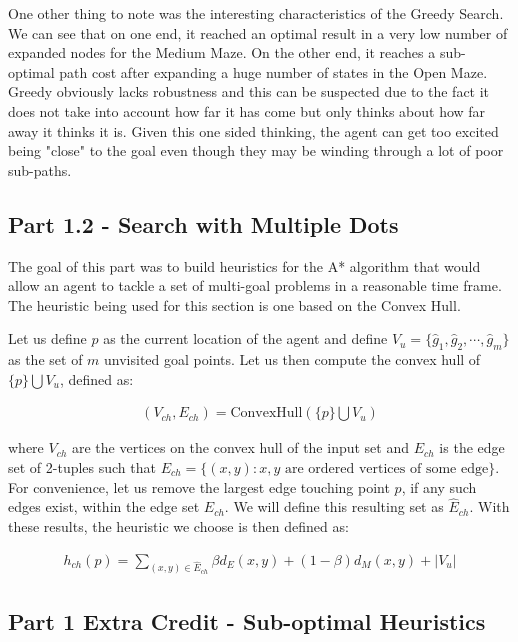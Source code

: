 \documentclass{article}[12pt]
\begin{document}
   One other thing to note was the interesting characteristics of the Greedy Search. We can see that on one end, it reached an optimal result in a very low number of expanded nodes for the Medium Maze. On the other end, it reaches a sub-optimal path cost after expanding a huge number of states in the Open Maze. Greedy obviously lacks robustness and this can be suspected due to the fact it does not take into account how far it has come but only thinks about how far away it thinks it is. Given this one sided thinking, the agent can get too excited being "close" to the goal even though they may be winding through a lot of poor sub-paths.
   
    
   
    \newpage
   \subsection{Part 1.2 - Search with Multiple Dots}
The goal of this part was to build heuristics for the A* algorithm that would allow an agent to tackle a set of multi-goal problems in a reasonable time frame. The heuristic being used for this section is one based on the Convex Hull. 

Let us define $p$ as the current location of the agent and define $V_u = \lbrace \hat{g}_1, \hat{g}_2, \cdots, \hat{g}_m \rbrace$ as the set of $m$ unvisited goal points. Let us then compute the convex hull of $\lbrace p \rbrace \bigcup V_u$, defined as:

\begin{align*}
\left(V_{ch}, E_{ch} \right) = \text{ConvexHull}\left(\lbrace p \rbrace \bigcup V_u \right)
\end{align*}

where $V_{ch}$ are the vertices on the convex hull of the input set and $E_{ch}$ is the edge set of 2-tuples such that $E_{ch} = \lbrace (x,y): x,y \text{ are ordered vertices of some edge} \rbrace$. For convenience, let us remove the largest edge touching point $p$, if any such edges exist, within the edge set $E_{ch}$. We will define this resulting set as $\hat{E}_{ch}$. With these results, the heuristic we choose is then defined as:

\begin{align*}
h_{ch}(p) = \sum_{(x,y) \in \hat{E}_{ch}} \beta d_{E}(x,y) + \left(1-\beta\right) d_{M}(x,y) + |V_u|
\end{align*}
   
   \newpage
   \subsection{Part 1 Extra Credit - Sub-optimal Heuristics}
   
\end{document}
